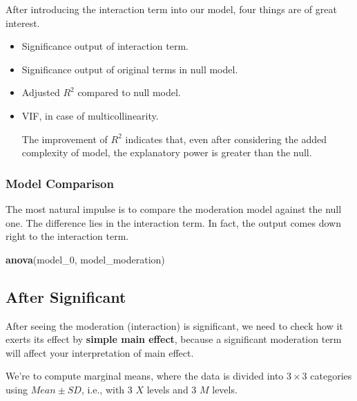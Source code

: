 \documentclass[
]{ctexart}
\newenvironment{Shaded}{\begin{snugshade}}{\end{snugshade}}
\newcommand{\FunctionTok}[1]{\textcolor[rgb]{0.13,0.29,0.53}{\textbf{#1}}}
\newcommand{\NormalTok}[1]{#1}
\begin{document}
After introducing the interaction term into our model, four things are
of great interest.

\begin{itemize}
\item
  Significance output of interaction term.
\item
  Significance output of original terms in null model.
\item
  Adjusted \(R^2\) compared to null model.
\item
  VIF, in case of multicollinearity.

  The improvement of \(R^2\) indicates that, even after considering the
  added complexity of model, the explanatory power is greater than the
  null.
\end{itemize}

\hypertarget{model-comparison}{%
\subsubsection{Model Comparison}\label{model-comparison}}

The most natural impulse is to compare the moderation model against the
null one. The difference lies in the interaction term. In fact, the
output comes down right to the interaction term.

\begin{Shaded}
\begin{Highlighting}[]
\FunctionTok{anova}\NormalTok{(model\_0, model\_moderation)}
\end{Highlighting}
\end{Shaded}

\hypertarget{after-significant}{%
\subsection{After Significant}\label{after-significant}}

After seeing the moderation (interaction) is significant, we need to
check how it exerts its effect by \textbf{simple main effect}, because a
significant moderation term will affect your interpretation of main
effect.

We're to compute marginal means, where the data is divided into
\(3\times 3\) categories using \(Mean \pm SD\), i.e., with 3 \(X\)
levels and 3 \(M\) levels.
\end{document}

